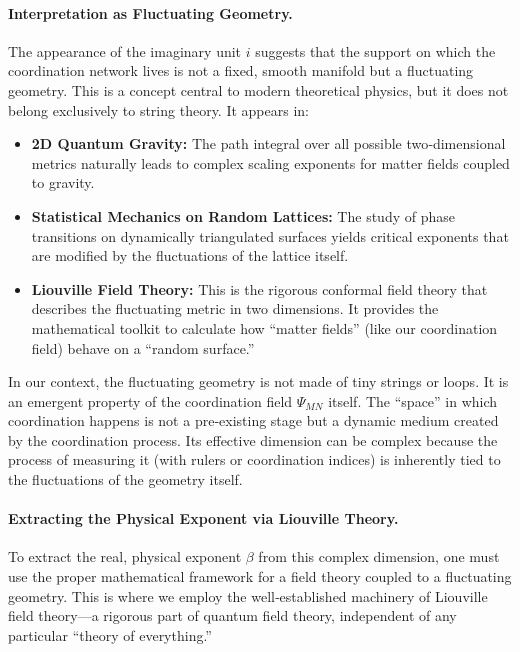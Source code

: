 \documentclass[12pt,a4paper]{article}
\theoremstyle{remark}
\begin{document}
\paragraph{Interpretation as Fluctuating Geometry.}
The appearance of the imaginary unit \(i\) suggests that the support on which the coordination network lives is not a fixed, smooth manifold but a fluctuating geometry. This is a concept central to modern theoretical physics, but it does not belong exclusively to string theory. It appears in:
\begin{itemize}
	\item \textbf{2D Quantum Gravity:} The path integral over all possible two‑dimensional metrics naturally leads to complex scaling exponents for matter fields coupled to gravity.
	\item \textbf{Statistical Mechanics on Random Lattices:} The study of phase transitions on dynamically triangulated surfaces yields critical exponents that are modified by the fluctuations of the lattice itself.
	\item \textbf{Liouville Field Theory:} This is the rigorous conformal field theory that describes the fluctuating metric in two dimensions. It provides the mathematical toolkit to calculate how “matter fields” (like our coordination field) behave on a “random surface.”
\end{itemize}
In our context, the fluctuating geometry is not made of tiny strings or loops. It is an emergent property of the coordination field \(\Psi_{MN}\) itself. The “space” in which coordination happens is not a pre‑existing stage but a dynamic medium created by the coordination process. Its effective dimension can be complex because the process of measuring it (with rulers or coordination indices) is inherently tied to the fluctuations of the geometry itself.

\paragraph{Extracting the Physical Exponent via Liouville Theory.}
To extract the real, physical exponent \(\beta\) from this complex dimension, one must use the proper mathematical framework for a field theory coupled to a fluctuating geometry. This is where we employ the well‑established machinery of Liouville field theory—a rigorous part of quantum field theory, independent of any particular “theory of everything.”
\end{document}

